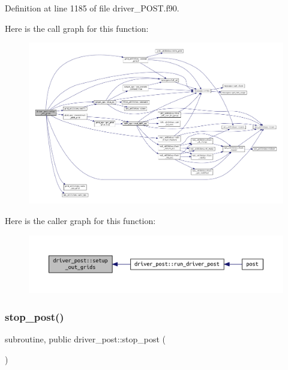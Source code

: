 Definition at line 1185 of file driver\+\_\+\+P\+O\+S\+T.\+f90.

Here is the call graph for this function\+:\nopagebreak
\begin{figure}[H]
\begin{center}
\leavevmode
\includegraphics[width=350pt]{namespacedriver__post_a3438685c5fb7302f756c368fb5f940ee_cgraph}
\end{center}
\end{figure}
Here is the caller graph for this function\+:\nopagebreak
\begin{figure}[H]
\begin{center}
\leavevmode
\includegraphics[width=350pt]{namespacedriver__post_a3438685c5fb7302f756c368fb5f940ee_icgraph}
\end{center}
\end{figure}
\mbox{\label{namespacedriver__post_a71f9fb1935222111e1c7cfc15c5d0269}} 
\subsubsection{\texorpdfstring{stop\+\_\+post()}{stop\_post()}}
{\footnotesize\ttfamily subroutine, public driver\+\_\+post\+::stop\+\_\+post (\begin{DoxyParamCaption}{ }\end{DoxyParamCaption})}



